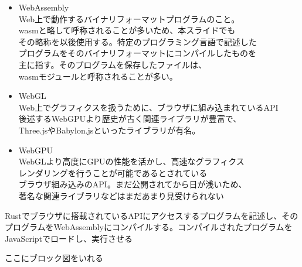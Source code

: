 \begin{itemize}
	\item WebAssembly\\Web上で動作するバイナリフォーマットプログラムのこと。\\wasmと略して呼称されることが多いため、本スライドでも\\その略称を以後使用する。特定のプログラミング言語で記述した\\プログラムをそのバイナリフォーマットにコンパイルしたものを\\主に指す。そのプログラムを保存したファイルは、\\wasmモジュールと呼称されることが多い。
	\newpage
	
	\item WebGL\\Web上でグラフィクスを扱うために、ブラウザに組み込まれているAPI\\後述するWebGPUより歴史が古く関連ライブラリが豊富で、\\Three.jsやBabylon.jsといったライブラリが有名。
	
	\item WebGPU\\WebGLより高度にGPUの性能を活かし、高速なグラフィクス\\レンダリングを行うことが可能であるとされている\\ブラウザ組み込みのAPI。まだ公開されてから日が浅いため、\\著名な関連ライブラリなどはまだあまり見受けられない
\end{itemize}

Rustでブラウザに搭載されているAPIにアクセスするプログラムを記述し、そのプログラムをWebAssemblyにコンパイルする。コンパイルされたプログラムをJavaScriptでロードし、実行させる

ここにブロック図をいれる
\newpage

